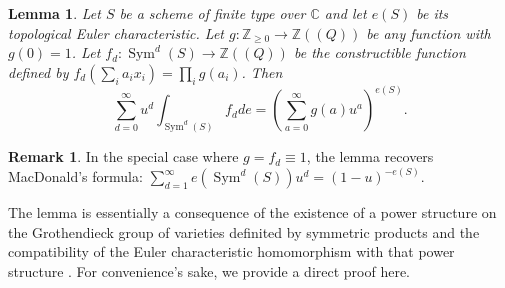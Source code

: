 \documentclass{amsart}
\newtheorem{lemma}[theorem]{Lemma}
\theoremstyle{definition}
\newtheorem{remark}[theorem]{Remark}
\newcommand{\CC} {\mathbb{C}}          %
\newcommand{\ZZ} {\mathbb{Z}}		%
\newcommand{\Sym}{\operatorname{Sym}}
\begin{document}
\begin{lemma}\label{lem: formula for euler char of sym products}
Let $S$ be a scheme of finite type over $\CC $ and let $e (S)$ be its
topological Euler characteristic. Let $g:\ZZ _{\geq 0}\to \ZZ ((Q))$
be any function with $g (0)=1$. Let $f_{d}:\Sym ^{d} (S)\to \ZZ ((Q))$
be the constructible function defined by $f_{d} (\sum_{i}
a_{i}x_{i})=\prod _{i}g (a_{i})$. Then
\[
\sum _{d=0}^{\infty } u^{d} \int _{\Sym ^{d} (S)} f_{d} de =
\left(\sum _{a=0}^{\infty }g (a) u^{a} \right)^{e (S)}.
\]
\end{lemma}

\begin{remark} \label{MacD}
In the special case where $g=f_{d}\equiv  1$, the lemma recovers
MacDonald's formula: $\sum _{d=1}^{\infty }e (\Sym ^{d} (S)) u^{d} =
(1-u)^{-e (S)}$. 

The lemma is essentially a consequence of the existence of a power
structure on the Grothendieck group of varieties definited by
symmetric products and the compatibility of the Euler characteristic
homomorphism with that power structure \cite{}. For convenience's
sake, we provide a direct proof here.
\end{remark}
\end{document}

